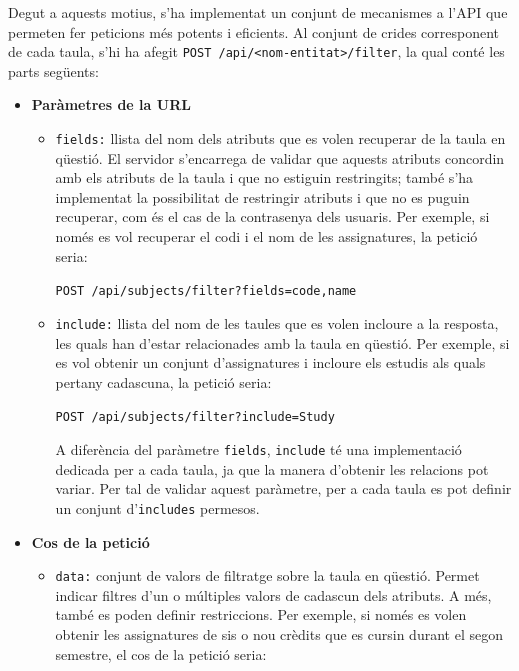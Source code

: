 \documentclass[a4paper,12pt]{ThesisStyle}
\begin{document}
Degut a aquests motius, s'ha implementat un conjunt de mecanismes a l'API que permeten fer peticions més potents i eficients. Al conjunt de crides corresponent de cada taula, s'hi ha afegit \texttt{POST /api/<nom-entitat>/filter}, la qual conté les parts següents:
\begin{itemize}
  \item \textbf{Paràmetres de la URL}
  \begin{itemize}
    \item \texttt{fields:} llista del nom dels atributs que es volen recuperar de la taula en qüestió. El servidor s'encarrega de validar que aquests atributs concordin amb els atributs de la taula i que no estiguin restringits; també s'ha implementat la possibilitat de restringir atributs i que no es puguin recuperar, com és el cas de la contrasenya dels usuaris. Per exemple, si només es vol recuperar el codi i el nom de les assignatures, la petició seria:\\[-0.6cm]
    \begin{center}
      \texttt{POST /api/subjects/filter?fields=code,name}
    \end{center}
    \item \texttt{include:} llista del nom de les taules que es volen incloure a la resposta, les quals han d'estar relacionades amb la taula en qüestió. Per exemple, si es vol obtenir un conjunt d'assignatures i incloure els estudis als quals pertany cadascuna, la petició seria:\\[-0.6cm]
    \begin{center}
      \texttt{POST /api/subjects/filter?include=Study}
    \end{center}
    A diferència del paràmetre \texttt{fields}, \texttt{include} té una implementació dedicada per a cada taula, ja que la manera d'obtenir les relacions pot variar. Per tal de validar aquest paràmetre, per a cada taula es pot definir un conjunt d'\texttt{includes} permesos.
  \end{itemize}
  \item \textbf{Cos de la petició}
  \begin{itemize}
    \item \texttt{data:} conjunt de valors de filtratge sobre la taula en qüestió. Permet indicar filtres d'un o múltiples valors de cadascun dels atributs. A més, també es poden definir restriccions. Per exemple, si només es volen obtenir les assignatures de sis o nou crèdits que es cursin durant el segon semestre, el cos de la petició seria:\\[-0.6cm]

\end{itemize}
\end{itemize}
\end{document}
